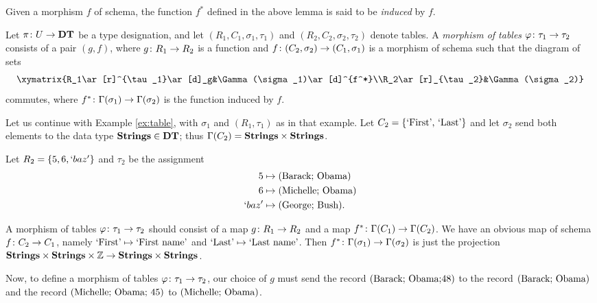 \documentclass{amsart}
\def\DT{{\bf DT}}
\def\Strings{{\bf Strings}}
\begin{document}
Given a morphism $f$ of schema, the function $f^*$ defined in the above lemma is said to be {\em induced} by $f$.

\begin{definition}\label{def:morphism of tables}

Let $\pi\taking U\to\DT$ be a type designation, and let $(R_1,C_1,\sigma_1,\tau_1)$ and $(R_2,C_2,\sigma_2,\tau_2)$ denote tables.  A {\em morphism of tables} $\varphi\colon\tau_1\rightarrow\tau_2$ consists of a pair $(g,f)$, where $g\colon R_1\rightarrow R_2$ is a function and $f\colon (C_2,\sigma_2)\rightarrow(C_1,\sigma_1)$ is a morphism of schema such that the diagram of sets \begin{align}\label{dia:morphism of tables}\xymatrix{R_1\ar[r]^{\tau_1}\ar[d]_g&\Gamma(\sigma_1)\ar[d]^{f^*}\\R_2\ar[r]_{\tau_2}&\Gamma(\sigma_2)}\end{align} commutes, where $f^*\colon\Gamma(\sigma_1)\rightarrow\Gamma(\sigma_2)$ is the function induced by $f$.

\end{definition}

\begin{example}\label{ex:morphism of tables}

Let us continue with Example \ref{ex:table}, with $\sigma_1$ and $(R_1,\tau_1)$ as in that example.  Let $C_2=\{\textnormal{`First', `Last'}\}$ and let $\sigma_2$ send both elements to the data type $\Strings\in\DT$; thus $\Gamma(C_2)=\Strings\cross\Strings$.  

Let $R_2=\{5,6,`baz'\}$ and $\tau_2$ be the assignment \begin{align*}5&\mapsto \textnormal{(Barack; Obama)}\\6 &\mapsto\textnormal{(Michelle; Obama)}\\`baz' &\mapsto\textnormal{(George; Bush)}.\end{align*}  

A morphism of tables $\varphi\colon\tau_1\rightarrow\tau_2$ should consist of a map $g\colon R_1\rightarrow R_2$ and a map $f^*\colon\Gamma(C_1)\rightarrow\Gamma(C_2)$.   We have an obvious map of schema $f\colon C_2\rightarrow C_1$, namely $\textnormal{`First'}\mapsto\textnormal{`First name'}$ and $\textnormal{`Last'}\mapsto\textnormal{`Last name'}$.  Then $f^*\colon\Gamma(\sigma_1)\rightarrow\Gamma(\sigma_2)$ is just the projection $\Strings\cross\Strings\cross\ZZ\to\Strings\cross\Strings$.

Now, to define a morphism of tables $\varphi\colon\tau_1\rightarrow\tau_2$, our choice of $g$ must send the record $(\textnormal{Barack; Obama;48})$ to the record $(\textnormal{Barack; Obama})$ and the record $(\textnormal{Michelle; Obama; 45})$ to $(\textnormal{Michelle; Obama})$.  

\end{example}
\end{document}
